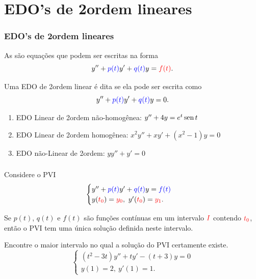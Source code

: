 \section{EDO's de 2\textordfeminine ordem lineares }




\begin{frame}
\frametitle{ EDO's de 2\fm ordem lineares}

As  são equações que podem ser escritas na forma
\[y''+{\color{blue}p(t)}y'+{\color{blue}q(t)}y={\color{red}f(t)}.\]

Uma EDO de 2\fm ordem linear é dita  se ela pode ser escrita como
\begin{equation}\label{eq_hom_2}
y''+{\color{blue}p(t)}y'+{\color{blue}q(t)}y=0.
\end{equation}

\begin{exe}
\begin{enumerate}
\item EDO Linear de 2\fm ordem não-homogênea: $y''+4y=e^t\operatorname{sen} t$

\item EDO Linear de 2\fm ordem homogênea: $x^2y''+xy'+(x^2-1)y=0$

\item EDO não-Linear de 2\fm ordem: $yy''+y'=0$
\end{enumerate}
\end{exe}
\end{frame}



\begin{frame}
\frametitle{ }
\begin{teo}
Considere o PVI
\[
\begin{cases}
y''+{\color{blue}p(t)}y'+{\color{blue}q(t)}y={\color{blue}f(t)}\\
y({\color{red}t_0})= {\color{red}y_0},\  y'({\color{red}t_0})={\color{red}y_1}.
\end{cases}
\]

Se {\color{blue}$p(t)$, $q(t)$ e $f(t)$} são funções contínuas em um intervalo ${\color{red}I}$ contendo ${\color{red}t_0}$, então o PVI tem {\color{blue} uma única solução definida neste intervalo}.
\end{teo}

\begin{exe} Encontre o maior intervalo no qual a solução do PVI certamente existe.
\[\begin{cases}
(t^2-3t)y''+ty'-(t+3)y=0\\
y(1)= 2,\  y'(1)=1.
\end{cases} 
\]


\end{exe}
\end{frame}

